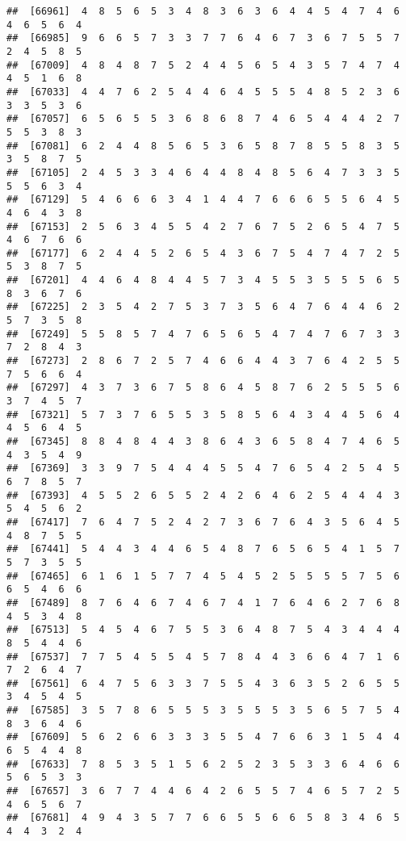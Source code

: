 \documentclass[
]{book}
\begin{document}
\begin{verbatim}
##  [66961]  4  8  5  6  5  3  4  8  3  6  3  6  4  4  5  4  7  4  6  4  6  5  6  4
##  [66985]  9  6  6  5  7  3  3  7  7  6  4  6  7  3  6  7  5  5  7  2  4  5  8  5
##  [67009]  4  8  4  8  7  5  2  4  4  5  6  5  4  3  5  7  4  7  4  4  5  1  6  8
##  [67033]  4  4  7  6  2  5  4  4  6  4  5  5  5  4  8  5  2  3  6  3  3  5  3  6
##  [67057]  6  5  6  5  5  3  6  8  6  8  7  4  6  5  4  4  4  2  7  5  5  3  8  3
##  [67081]  6  2  4  4  8  5  6  5  3  6  5  8  7  8  5  5  8  3  5  3  5  8  7  5
##  [67105]  2  4  5  3  3  4  6  4  4  8  4  8  5  6  4  7  3  3  5  5  5  6  3  4
##  [67129]  5  4  6  6  6  3  4  1  4  4  7  6  6  6  5  5  6  4  5  4  6  4  3  8
##  [67153]  2  5  6  3  4  5  5  4  2  7  6  7  5  2  6  5  4  7  5  4  6  7  6  6
##  [67177]  6  2  4  4  5  2  6  5  4  3  6  7  5  4  7  4  7  2  5  5  3  8  7  5
##  [67201]  4  4  6  4  8  4  4  5  7  3  4  5  5  3  5  5  5  6  5  8  3  6  7  6
##  [67225]  2  3  5  4  2  7  5  3  7  3  5  6  4  7  6  4  4  6  2  5  7  3  5  8
##  [67249]  5  5  8  5  7  4  7  6  5  6  5  4  7  4  7  6  7  3  3  7  2  8  4  3
##  [67273]  2  8  6  7  2  5  7  4  6  6  4  4  3  7  6  4  2  5  5  7  5  6  6  4
##  [67297]  4  3  7  3  6  7  5  8  6  4  5  8  7  6  2  5  5  5  6  3  7  4  5  7
##  [67321]  5  7  3  7  6  5  5  3  5  8  5  6  4  3  4  4  5  6  4  4  5  6  4  5
##  [67345]  8  8  4  8  4  4  3  8  6  4  3  6  5  8  4  7  4  6  5  4  3  5  4  9
##  [67369]  3  3  9  7  5  4  4  4  5  5  4  7  6  5  4  2  5  4  5  6  7  8  5  7
##  [67393]  4  5  5  2  6  5  5  2  4  2  6  4  6  2  5  4  4  4  3  5  4  5  6  2
##  [67417]  7  6  4  7  5  2  4  2  7  3  6  7  6  4  3  5  6  4  5  4  8  7  5  5
##  [67441]  5  4  4  3  4  4  6  5  4  8  7  6  5  6  5  4  1  5  7  5  7  3  5  5
##  [67465]  6  1  6  1  5  7  7  4  5  4  5  2  5  5  5  5  7  5  6  6  5  4  6  6
##  [67489]  8  7  6  4  6  7  4  6  7  4  1  7  6  4  6  2  7  6  8  4  5  3  4  8
##  [67513]  5  4  5  4  6  7  5  5  3  6  4  8  7  5  4  3  4  4  4  8  5  4  4  6
##  [67537]  7  7  5  4  5  5  4  5  7  8  4  4  3  6  6  4  7  1  6  7  2  6  4  7
##  [67561]  6  4  7  5  6  3  3  7  5  5  4  3  6  3  5  2  6  5  5  3  4  5  4  5
##  [67585]  3  5  7  8  6  5  5  5  3  5  5  5  3  5  6  5  7  5  4  8  3  6  4  6
##  [67609]  5  6  2  6  6  3  3  3  5  5  4  7  6  6  3  1  5  4  4  6  5  4  4  8
##  [67633]  7  8  5  3  5  1  5  6  2  5  2  3  5  3  3  6  4  6  6  5  6  5  3  3
##  [67657]  3  6  7  7  4  4  6  4  2  6  5  5  7  4  6  5  7  2  5  4  6  5  6  7
##  [67681]  4  9  4  3  5  7  7  6  6  5  5  6  6  5  8  3  4  6  5  4  4  3  2  4

\end{verbatim}
\end{document}

